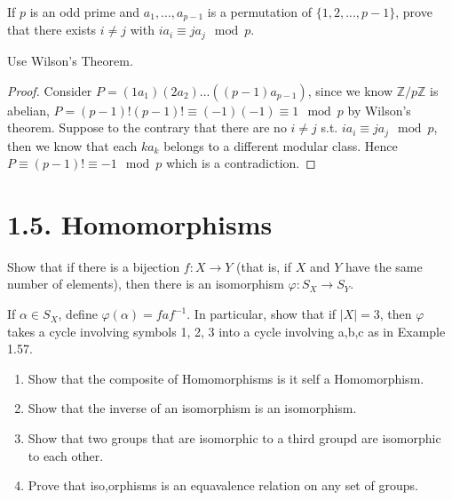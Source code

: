 \documentclass[15pt]{article}
\newenvironment{exercise}[2][Exercise]{\begin{trivlist}
\item[\hskip \labelsep {\bfseries #1}\hskip \labelsep {\bfseries #2.}]}
{\end{trivlist}}
\newenvironment{hint}[2][Hint]{\begin{trivlist}
    \item[\hskip \labelsep {\bfseries #1}\hskip \labelsep {\bfseries #2.}]}
    {\end{trivlist}}
\begin{document}
\begin{exercise}{1.45}
    If $p$ is an odd prime and $a_1,...,a_{p-1}$ is a permutation of $\{1,2,...,p-1\}$, prove that
    there exists $i \neq j$ with $ia_i \equiv ja_j \mod p$.
    \begin{hint}{}
        Use Wilson's Theorem.
    \end{hint}
\end{exercise}


\begin{proof}
    Consider $P = \left(1a_1\right)\left(2a_2\right)...\left((p-1)a_{p-1}\right)$, since we know $\mathbb{Z} /p \mathbb{Z}$ is abelian, 
    $P= (p-1)! (p-1)! \equiv (-1)(-1) \equiv 1 \mod p$ by Wilson's theorem. Suppose to the contrary that there are no $i\neq j$ s.t. 
    $ia_i \equiv ja_j \mod p$, then we know that each $ka_k$ belongs to a different modular class. Hence $P\equiv (p-1)! \equiv -1 \mod p$ 
    which is a contradiction.
\end{proof}



\section*{1.5.  Homomorphisms}


\begin{exercise}{1.46}

    Show that if there is a bijection $f: X\rightarrow Y$ (that is, if $X$ and $Y$ have the same number of elements),
    then there is an isomorphism $\varphi: S_X \rightarrow S_Y$.
    \begin{hint}{}
        If $\alpha \in S_X$, define $\varphi(\alpha) = faf^{-1}$. In particular, show that if $|X|=3$, then $\varphi$
        takes a cycle involving symbols 1, 2, 3 into a cycle involving a,b,c as in Example 1.57.
    \end{hint}
    
\end{exercise}


\begin{exercise}{1.47}
    \begin{enumerate}
        \item[(i)] Show that the composite of Homomorphisms is it self a Homomorphism.
        \item[(ii)] Show that the inverse of an isomorphism is an isomorphism.
        \item[(iii)] Show that two groups that are isomorphic to a third groupd are isomorphic to each other.
        \item[(iv)] Prove that iso,orphisms is an equavalence relation on any set of groups.
    \end{enumerate}
\end{exercise}
\end{document}
